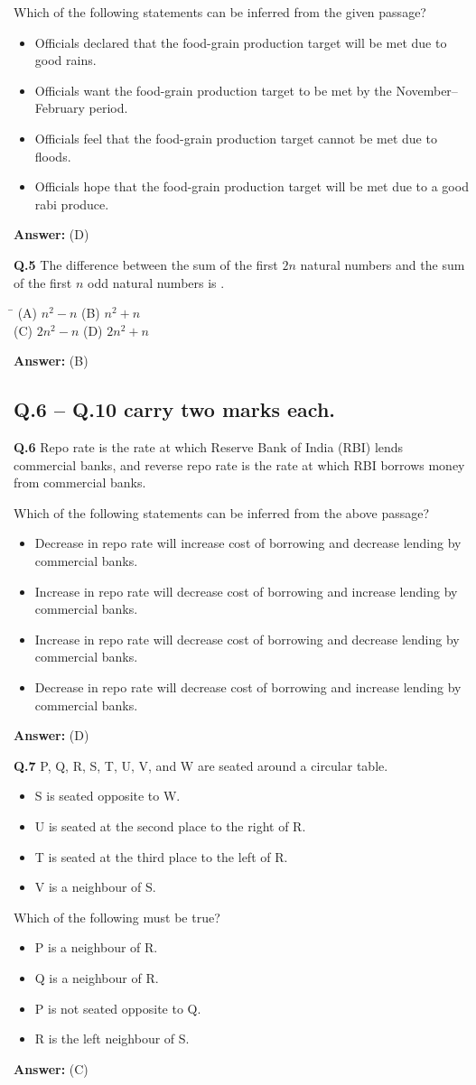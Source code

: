\documentclass[11pt,a4paper]{article}
\newcommand{\optsfourA}[4]{%
  \begin{tabbing}
    \hspace{0.48\linewidth}\=\kill
    (A) #1 \> (B) #2 \\[2pt]
    (C) #3 \> (D) #4
  \end{tabbing}%
}
\newcommand{\optslistA}[4]{%
  \begin{itemize}
    \setlength{\itemsep}{2pt}\setlength{\parskip}{0pt}
    \item[(A)] #1
    \item[(B)] #2
    \item[(C)] #3
    \item[(D)] #4
  \end{itemize}%
}
\newcommand{\ans}[1]{\textbf{Answer:} #1\par\medskip}
\begin{document}
Which of the following statements can be inferred from the given passage?
\optslistA{Officials declared that the food-grain production target will be met due to good rains.}{Officials want the food-grain production target to be met by the November--February period.}{Officials feel that the food-grain production target cannot be met due to floods.}{Officials hope that the food-grain production target will be met due to a good rabi produce.}
\ans{(D)}

\textbf{Q.5} The difference between the sum of the first $2n$ natural numbers and the sum of the first $n$ odd natural numbers is \underline{\hspace{2cm}}.
\optsfourA{$n^2 - n$}{$n^2 + n$}{$2n^2 - n$}{$2n^2 + n$}
\ans{(B)}

\subsection*{Q.6 -- Q.10 carry two marks each.}

\textbf{Q.6} Repo rate is the rate at which Reserve Bank of India (RBI) lends commercial banks, and reverse repo rate is the rate at which RBI borrows money from commercial banks.

Which of the following statements can be inferred from the above passage?
\optslistA{Decrease in repo rate will increase cost of borrowing and decrease lending by commercial banks.}{Increase in repo rate will decrease cost of borrowing and increase lending by commercial banks.}{Increase in repo rate will decrease cost of borrowing and decrease lending by commercial banks.}{Decrease in repo rate will decrease cost of borrowing and increase lending by commercial banks.}
\ans{(D)}

\textbf{Q.7} P, Q, R, S, T, U, V, and W are seated around a circular table.
\begin{itemize}
  \setlength{\itemsep}{1pt}\setlength{\parskip}{0pt}
  \item[I.] S is seated opposite to W.
  \item[II.] U is seated at the second place to the right of R.
  \item[III.] T is seated at the third place to the left of R.
  \item[IV.] V is a neighbour of S.
\end{itemize}
Which of the following must be true?
\optslistA{P is a neighbour of R.}{Q is a neighbour of R.}{P is not seated opposite to Q.}{R is the left neighbour of S.}
\ans{(C)}
\end{document}
